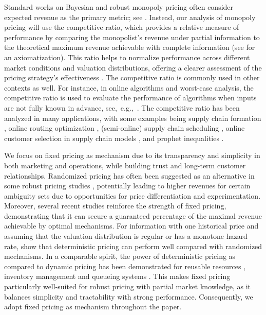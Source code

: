 \documentclass[11pt]{article}
\newcommand{\1}{\mathds{1}}
\begin{document}
Standard works on Bayesian and robust monopoly pricing often consider expected revenue as the primary metric; see \citep{riley1983optimal, myerson1981optimal,azar2012optimal,carrasco2018optimal}.
Instead, our analysis of monopoly pricing will use the competitive ratio, which provides a relative measure of performance by comparing the monopolist's revenue under partial information to the theoretical maximum revenue achievable with complete information (see \cite{terlizzese2008ief} for an axiomatization). This ratio helps to normalize performance across different market conditions and valuation distributions, offering a clearer assessment of the pricing strategy's effectiveness \citep{chen2022distribution, giannakopoulos2019robust, eren2010monopoly,  wang2024minimax,bahamou2024fast}. The competitive ratio is commonly used in other contexts as well. 
For instance, in online algorithms and worst-case analysis, the competitive ratio is used to evaluate the performance of algorithms when inputs are not fully known in advance, see,~e.g.,~\citep{borodin2005online}. The competitive ratio has been analyzed in many applications, with some examples being supply chain formation \citep{babaioff2005incentive}, online routing optimization \citep{jaillet2008generalized}, (semi-online) supply chain scheduling \citep{averbakh2012semi}, online customer selection in supply chain models \citep{elmachtoub2016supply}, and prophet inequalities \citep{lucier2017economic}.

We focus on fixed pricing as mechanism due to its transparency and simplicity in both marketing and operations, while building trust and long-term customer relationships. Randomized pricing has often been suggested as an alternative in some robust pricing studies \citep{carrasco2018optimal,wang2024minimax}, potentially leading to higher revenues for certain ambiguity sets due to opportunities for price differentiation and experimentation. 
Moreover, several recent studies reinforce the strength of fixed pricing, demonstrating that it can secure a guaranteed percentage of the maximal revenue achievable by optimal mechanisms. For information with one historical price and assuming that the valuation distribution is regular or has a monotone hazard rate, 
\cite{allouah2023optimal} show that deterministic pricing can perform well compared with randomized mechanisms. In a comparable spirit, the power of deterministic pricing as compared to dynamic pricing has been demonstrated for reusable resources \citep{elmachtoub2023power}, inventory management \citep{elmachtoub2023simple}  and  queueing systems \citep{bergquist2023static}.
This makes fixed pricing particularly well-suited for robust pricing with partial market knowledge, as it balances simplicity and tractability with strong performance. Consequently, we adopt fixed pricing as mechanism throughout the paper. 
\end{document}

